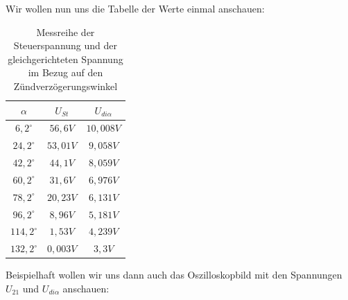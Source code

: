 \documentclass{article}
\begin{document}
\newpage

Wir wollen nun uns die Tabelle der Werte einmal anschauen:

\begin{table}[h]
  \centering
  \begin{tabular}{|c|c|c|}
    \hline
    $\alpha$ & $U_{St}$ & $U_{di\alpha}$ \\
    \hline
    $6,2^{\circ}$ & $56,6V$ & $10,008V$\\
    \hline
    $24,2^{\circ}$ &$53,01V$ & $9,058V$\\
    \hline
    $42,2^{\circ}$ &$44,1V$ & $8,059V$\\
    \hline
    $60,2^{\circ}$ & $31,6V$& $6,976V$\\
    \hline
    $78,2^{\circ}$ & $20,23V$& $6,131V$\\
    \hline
    $96,2^{\circ}$ & $8,96V$& $5,181V$\\
    \hline
    $114,2^{\circ}$ &$1,53V$ & $4,239V$\\
    \hline
    $132,2^{\circ}$ & $0,003V$& $3,3V$\\
    \hline
  \end{tabular}
  \caption{Messreihe der Steuerspannung und der gleichgerichteten Spannung im Bezug auf den Zündverzögerungswinkel}
  \label{tab:mess1}
\end{table}

Beispielhaft wollen wir uns dann auch das Oszilloskopbild mit den Spannungen $U_{21}$ und $U_{di\alpha}$ anschauen:
\end{document}
